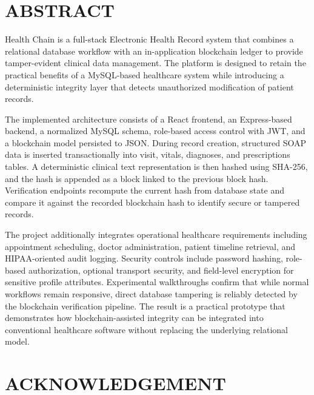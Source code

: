 \documentclass[12pt,a4paper]{report}
\begin{document}
\hypersetup{pageanchor=true}
\setcounter{page}{1}

\chapter*{ABSTRACT}

Health Chain is a full-stack Electronic Health Record system that combines a relational database workflow with an in-application blockchain ledger to provide tamper-evident clinical data management. The platform is designed to retain the practical benefits of a MySQL-based healthcare system while introducing a deterministic integrity layer that detects unauthorized modification of patient records.

The implemented architecture consists of a React frontend, an Express-based backend, a normalized MySQL schema, role-based access control with JWT, and a blockchain model persisted to JSON. During record creation, structured SOAP data is inserted transactionally into visit, vitals, diagnoses, and prescriptions tables. A deterministic clinical text representation is then hashed using SHA-256, and the hash is appended as a block linked to the previous block hash. Verification endpoints recompute the current hash from database state and compare it against the recorded blockchain hash to identify secure or tampered records.

The project additionally integrates operational healthcare requirements including appointment scheduling, doctor administration, patient timeline retrieval, and HIPAA-oriented audit logging. Security controls include password hashing, role-based authorization, optional transport security, and field-level encryption for sensitive profile attributes. Experimental walkthroughs confirm that while normal workflows remain responsive, direct database tampering is reliably detected by the blockchain verification pipeline. The result is a practical prototype that demonstrates how blockchain-assisted integrity can be integrated into conventional healthcare software without replacing the underlying relational model.

\chapter*{ACKNOWLEDGEMENT}
\end{document}
